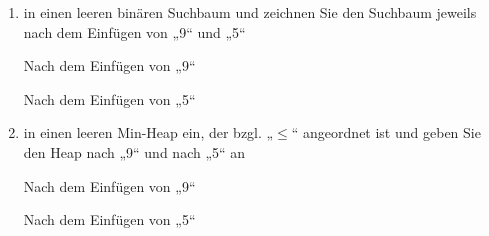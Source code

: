 \documentclass{bschlangaul-aufgabe}
\begin{document}
\begin{enumerate}


\item in einen leeren binären Suchbaum und zeichnen Sie den Suchbaum
jeweils nach dem Einfügen von „9“ und „5“

\begin{bAntwort}
\begin{bBaum}{Nach dem Einfügen von „9“}
\end{bBaum}

\begin{bBaum}{Nach dem Einfügen von „5“}
\end{bBaum}
\end{bAntwort}


\item in einen leeren Min-Heap ein, der bzgl. „$\leq$“ angeordnet ist und
geben Sie den Heap nach „9“ und nach „5“ an

\begin{bAntwort}
\begin{bBaum}{Nach dem Einfügen von „9“}
\end{bBaum}

\begin{bBaum}{Nach dem Einfügen von „5“}
\end{bBaum}

\end{bAntwort}


\end{enumerate}
\end{document}
